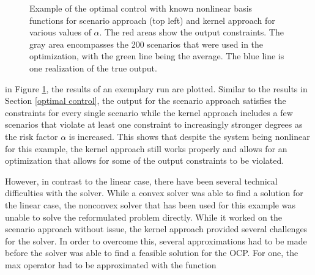 \begin{figure}[htb]
{		\centering
 } 
\caption{Example of the optimal control with known nonlinear basis functions for scenario approach (top left) and kernel approach for various values of $\alpha$. The red areas show the output constraints. The gray area encompasses the 200 scenarios that were used in the optimization, with the green line being the average. The blue line is one realization of the true output.}
\label{ScenarioKernelComparisonNonLinear}
\end{figure}

in Figure \ref{ScenarioKernelComparisonNonLinear}, the results of an exemplary run are plotted. Similar to the results in Section \ref{optimal control}, the output for the scenario approach satisfies the constraints for every single scenario while the kernel approach includes a few scenarios that violate at least one constraint to increasingly stronger degrees as the risk factor $\alpha$ is increased. This shows that despite the system being nonlinear for this example, the kernel approach still works properly and allows for an optimization that allows for some of the output constraints to be violated.

However, in contrast to the linear case, there have been several technical difficulties with the solver. While a convex solver was able to find a solution for the linear case, the nonconvex solver that has been used for this example was unable to solve the reformulated problem directly. While it worked on the scenario approach without issue, the kernel approach provided several challenges for the solver. In order to overcome this, several approximations had to be made before the solver was able to find a feasible solution for the OCP. For one, the max operator had to be approximated with the function

